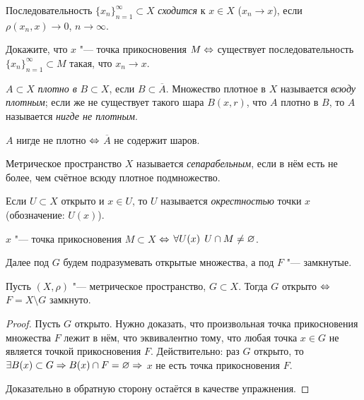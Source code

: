 \documentclass[main]{subfiles}
\begin{document}
\begin{definition}
  Последовательность \( \{ x_n \}_{n=1}^\infty \subset X \)
  \emph{сходится} к \( x \in X \) (\( x_n \to x \)),
  если \( \rho(x_n, x) \to 0 \), \( n \to \infty \).
\end{definition}

\begin{exercise}
  Докажите, что \( x \) "--- точка прикосновения \( M \Leftrightarrow \)
  существует последовательность \( \{ x_n \}_{n=1}^\infty \subset M \)
  такая, что \( x_n \to x \).
\end{exercise}

\begin{definition}
  \( A \subset X \) \emph{плотно в} \( B \subset X \),
  если \( B \subset \overline{A} \).
  Множество плотное в \( X \) называется \emph{всюду плотным};
  если же не существует такого шара \( B(x, r) \),
  что \( A \) плотно в \( B \),
  то \( A \) называется \emph{нигде не плотным}.
\end{definition}

\begin{proposition}
  \( A \) нигде не плотно \( \Leftrightarrow \) \( \overline{A} \) не содержит шаров.
\end{proposition}

\begin{definition}
  Метрическое пространство \( X \) называется \emph{сепарабельным},
  если в нём есть не более, чем счётное всюду плотное подмножество.
\end{definition}

\begin{definition}
  Если \( U \subset X \) открыто и \( x \in U \), то
  \( U \) называется \emph{окрестностью} точки \( x \)
  (обозначение: \( U(x) \)).
\end{definition}

\begin{proposition}
  \( x \) "--- точка прикосновения \( M \subset X \)
  \( \Leftrightarrow \) \( \forall {U(x)} \; \, U \cap M \ne \varnothing \).
\end{proposition}

Далее под \( G \) будем подразумевать открытые множества,
а под \( F \) "--- замкнутые.

\begin{theorem}
  Пусть \( (X, \rho) \) "--- метрическое пространство,
  \( G \subset X \). Тогда \( G \) открыто \( \Leftrightarrow \)
  \( F = X \setminus G \) замкнуто.
\end{theorem}
\begin{proof}
  Пусть \( G \) открыто. Нужно доказать, что
  произвольная точка прикосновения множества \( F \)
  лежит в нём, что эквивалентно тому, что любая точка
  \( x \in G \) не является точкой прикосновения \( F \).
  Действительно: раз \( G \) открыто, то
  \( \exists B(x) \subset G \Rightarrow B(x) \cap F = \varnothing \Rightarrow \)
  \( x \) не есть точка прикосновения \( F \).

  Доказательно в обратную сторону остаётся в качестве упражнения.
\end{proof}
\end{document}
